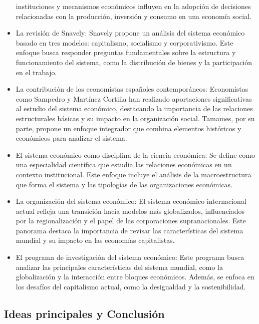 \documentclass[12pt]{book} %
\begin{document}
\begin{itemize}
  instituciones y mecanismos económicos influyen en la adopción de
  decisiones relacionadas con la producción, inversión y consumo en una
  economía social.
\item
  La revisión de Snavely: Snavely propone un análisis del sistema
  económico basado en tres modelos: capitalismo, socialismo y
  corporativismo. Este enfoque busca responder preguntas fundamentales
  sobre la estructura y funcionamiento del sistema, como la distribución
  de bienes y la participación en el trabajo.
\item
  La contribución de los economistas españoles contemporáneos:
  Economistas como Sampedro y Martínez Cortiña han realizado
  aportaciones significativas al estudio del sistema económico,
  destacando la importancia de las relaciones estructurales básicas y su
  impacto en la organización social. Tamames, por su parte, propone un
  enfoque integrador que combina elementos históricos y económicos para
  analizar el sistema.
\item
  El sistema económico como disciplina de la ciencia económica: Se
  define como una especialidad científica que estudia las relaciones
  económicas en un contexto institucional. Este enfoque incluye el
  análisis de la macroestructura que forma el sistema y las tipologías
  de las organizaciones económicas.
\item
  La organización del sistema económico: El sistema económico
  internacional actual refleja una transición hacia modelos más
  globalizados, influenciados por la regionalización y el papel de las
  corporaciones supranacionales. Este panorama destaca la importancia de
  revisar las características del sistema mundial y su impacto en las
  economías capitalistas.
\item
  El programa de investigación del sistema económico: Este programa
  busca analizar las principales características del sistema mundial,
  como la globalización y la interacción entre bloques económicos.
  Además, se enfoca en los desafíos del capitalismo actual, como la
  desigualdad y la sostenibilidad.
\end{itemize}

\hypertarget{ideas-principales-y-conclusiuxf3n}{%
\subsection{Ideas principales y
Conclusión}\label{ideas-principales-y-conclusiuxf3n}}
\end{document}
